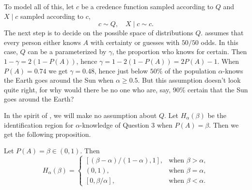 To model all of this, let $c$ be a credence function sampled according to $Q$ and $X\mid c$ sampled according to $c$,
\[
c\sim Q,\quad X\mid c\sim c.
\]
The next step is to decide on the possible space of distributions $Q$. \textcite[Chapter 2, endnote 28]{Caplan2018-oj} assumes that every person either knows $A$ with certainty or guesses with $50/50$ odds.
In this case, $Q$ can be a parameterized by $\gamma$, the proportion who knows for certain. Then $1-\gamma=2(1-P(A))$, hence $\gamma=1-2(1-P(A))=2P(A)-1$. When $P(A)=0.74$ we get $\gamma=0.48$, hence just below $50\%$ of the population $\alpha$-knows the Earth goes around the Sun when $\alpha\geq0.5$. But this assumption doesn't look quite right, for why would there be no one who are, say, $90\%$ certain that the Sun goes around the Earth?

In the spirit of \textcite{Manski2003-aq}, we will make no assumption about $Q$. Let $H_\alpha(\beta)$ be the identification region for $\alpha$-knowledge of Question 3 when $P(A) = \beta$. Then we get the following proposition.
\begin{proposition}
\label{prop:guessing regions}Let $P(A)=\beta\in(0,1)$. Then 
\[
H_{\alpha}(\beta)=\begin{cases}
[(\beta-\alpha)/(1-\alpha),1], & \textrm{when }\beta>\alpha,\\
(0,1), & \textrm{when }\beta=\alpha,\\{}
[0,\beta/\alpha], & \textrm{when }\beta<\alpha.
\end{cases}
\]
\end{proposition}

